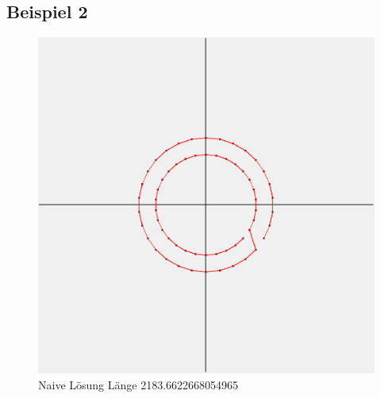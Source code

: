 \subsection{Beispiel 2}\label{subsec:beispiel-2}
\begin{figure}[h]
    \centering
    \begin{minipage}[b]{0.6\textwidth}
        \includegraphics[width=\textwidth]{naivwenigerkrumm2}
        \caption{Naive Lösung Länge 2183.6622668054965}
    \end{minipage}\label{fig:wenigerkrumm2}
\end{figure}
\FloatBarrier


